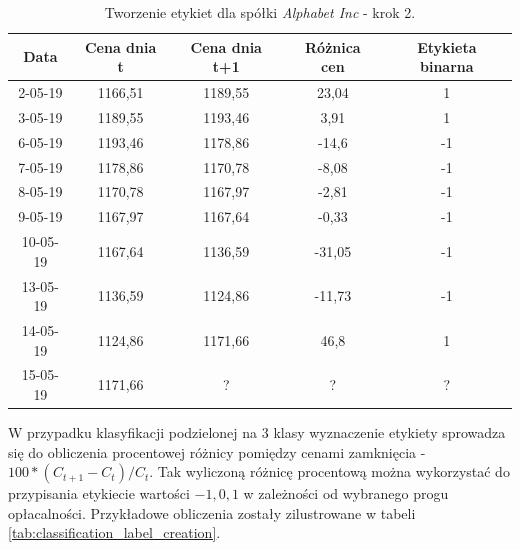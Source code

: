\documentclass[a4paper, twoside, 11pt, openright]{article}
\begin{document}
 \begin{table}[H]
    \centering
    \begin{tabular}{|c|c|c|c|c|}
    \hline
        \textbf{Data}  & \textbf{Cena dnia t} & \textbf{Cena dnia t+1} & \textbf{Różnica cen} & \textbf{Etykieta binarna} \\ \hline
            2-05-19 & 1166,51 & 1189,55 & 23,04 & 1 \\ \hline
            3-05-19 & 1189,55 & 1193,46 & 3,91 & 1 \\ \hline
            6-05-19 & 1193,46 & 1178,86 & -14,6 & -1 \\ \hline
            7-05-19 & 1178,86 & 1170,78 & -8,08 & -1\\ \hline
            8-05-19 & 1170,78 & 1167,97 & -2,81 & -1\\ \hline
            9-05-19 & 1167,97 & 1167,64 & -0,33 & -1\\ \hline
            10-05-19 & 1167,64 & 1136,59 & -31,05 & -1\\ \hline
            13-05-19 & 1136,59 & 1124,86 & -11,73 & -1\\ \hline
            14-05-19 & 1124,86 & 1171,66 & 46,8 & 1\\ \hline 
            15-05-19 & 1171,66 & ?      & ? & ? \\ \hline
    \end{tabular}
    \caption{Tworzenie etykiet dla spółki \textit{Alphabet Inc} - krok 2.}
    \label{tab:binary_label_creation}
\end{table} 

 W przypadku klasyfikacji podzielonej na 3 klasy wyznaczenie etykiety sprowadza się do obliczenia procentowej różnicy pomiędzy cenami zamknięcia - $100*(C_{t+1}-C_t)/C_t$. Tak wyliczoną różnicę procentową można wykorzystać do przypisania etykiecie wartości $-1, 0, 1$ w zależności od wybranego progu opłacalności. Przykładowe obliczenia zostały zilustrowane w tabeli \ref{tab:classification_label_creation}.
\end{document}

